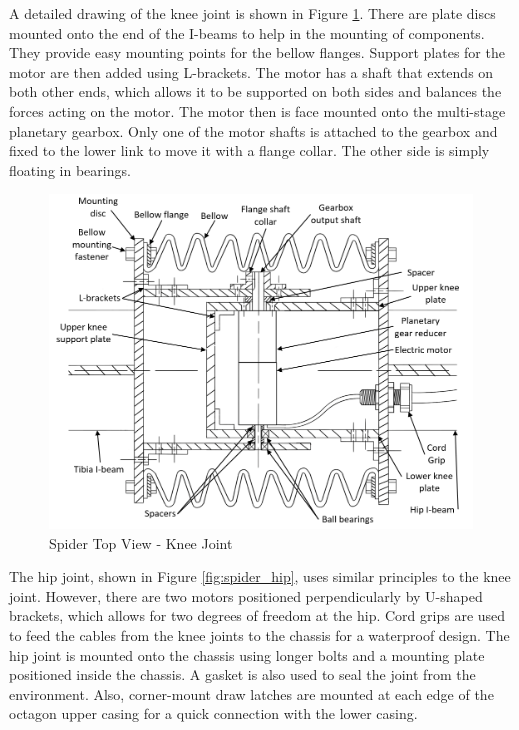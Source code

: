 A detailed drawing of the knee joint is shown in Figure \ref{fig:spider_knee}. There are plate discs mounted onto the end of the I-beams to help in the mounting of components. They provide easy mounting points for the bellow flanges. Support plates for the motor are then added using L-brackets. The motor has a shaft that extends on both other ends, which allows it to be supported on both sides and balances the forces acting on the motor. The motor then is face mounted onto the multi-stage planetary gearbox. Only one of the motor shafts is attached to the gearbox and fixed to the lower link to move it with a flange collar. The other side is simply floating in bearings.

\begin{figure}[H]
    \centering
    \includegraphics[width=\textwidth]{3_DesignConcepts/img/C3/kneejoint_ann.PNG}
    \caption{Spider Top View - Knee Joint}
    \label{fig:spider_knee}
\end{figure}

The hip joint, shown in Figure \ref{fig:spider_hip}, uses similar principles to the knee joint. However, there are two motors positioned perpendicularly by U-shaped brackets, which allows for two degrees of freedom at the hip. Cord grips are used to feed the cables from the knee joints to the chassis for a waterproof design. The hip joint is mounted onto the chassis using longer bolts and a mounting plate positioned inside the chassis. A gasket is also used to seal the joint from the environment. Also, corner-mount draw latches are mounted at each edge of the octagon upper casing for a quick connection with the lower casing.

